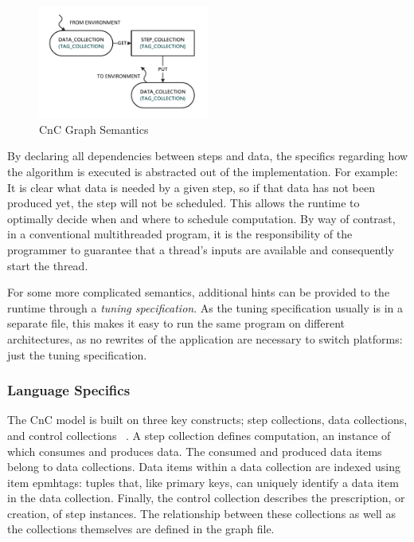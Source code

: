 \begin{figure}[t]
  \centering
  \includegraphics[width=0.5\textwidth]{drawings/CnCExample.pdf}
  \caption{CnC Graph Semantics}
  \label{fig:cnc_graph}
\end{figure}

By declaring all dependencies between steps and data, the specifics
regarding how the algorithm is executed is abstracted out of the
implementation. For example: It is clear what data is needed by a
given step, so if that data has not been produced yet, the step will
not be scheduled. This allows the runtime to optimally decide when and
where to schedule computation. By way of contrast, in a conventional
multithreaded program, it is the responsibility of the programmer to
guarantee that a thread's inputs are available and consequently start
the thread.

For some more complicated semantics, additional hints can be provided
to the runtime through a \emph{tuning specification}. As the tuning
specification usually is in a separate file, this makes it easy to run
the same program on different architectures, as no rewrites of the
application are necessary to switch platforms: just the tuning
specification.

\subsubsection{Language Specifics}
\label{sec:cnc_language}

The CnC model is built on three key constructs; step collections, data
collections, and control collections ~\cite{budimlicconcurrent}. A
step collection defines computation, an instance of which consumes and
produces data. The consumed and produced data items belong to data
collections. Data items within a data collection are indexed using
item epmh{tags}: tuples that, like primary keys, can uniquely identify a
data item in the data collection. Finally, the control collection
describes the prescription, or creation, of step instances. The
relationship between these collections as well as the collections
themselves are defined in the graph file.

